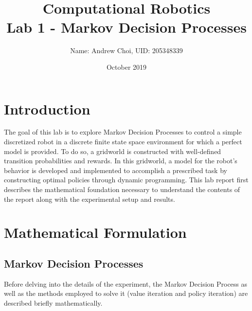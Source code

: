 \documentclass[fullpage]{article}
\title{\textbf{Computational Robotics} \\  Lab 1 - Markov Decision Processes}
\author{Name: Andrew Choi, UID: 205348339}
\date{October 2019}
\begin{document}
\maketitle

\section{Introduction}

The goal of this lab is to explore Markov Decision Processes to control a simple discretized robot in a discrete finite state space environment for which a perfect model is provided. To do so, a gridworld is constructed with well-defined transition probabilities and rewards. In this gridworld, a model for the robot's behavior is developed and implemented to accomplish a prescribed task by constructing optimal policies through dynamic programming. This lab report first describes the mathematical foundation necessary to understand the contents of the report along with the experimental setup and results.

\section{Mathematical Formulation}

\subsection{Markov Decision Processes}
Before delving into the details of the experiment, the Markov Decision Process as well as the methods employed to solve it (value iteration and policy iteration) are described briefly mathematically.
\end{document}
